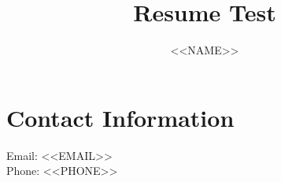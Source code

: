 \documentclass[a4paper]{article}
\title{Resume Test}
\author{<<NAME>>}
\date{}
\begin{document}
\maketitle
\section*{Contact Information}
Email: <<EMAIL>> \\
Phone: <<PHONE>>
\end{document}
